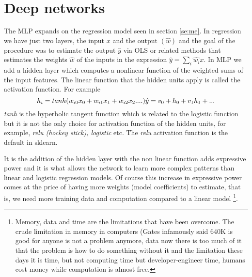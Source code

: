 \documentclass[12pt]{report}
\begin{document}


\section{Deep networks}
\label{se:deep}

The MLP expands on the regression model seen in section \ref{se:me}. In regression we have just two layers, the input $x$ and the output $(\hat{w})$ and the goal of the procedure was to estimate the output $\hat{y}$ via OLS or related methods that estimates the weights $\hat{w}$ of the inputs in the expression $\hat{y} = \sum_i \hat{w_i} x$. In MLP we add a hidden layer which computes a nonlinear function of the weighted sums of the input features. The linear function that the hidden units apply is called the activation function. For example
\begin{equation}
h_i = tanh(w_{i0}x_0 + w_{i1}x_1 + w_{i2}x_2 ....) \\
\hat{y} = v_0 + h_0 + v_1 h_1 + ...
\end{equation}
\textit{tanh} is the hyperbolic tangent function which is related to the logistic function but it is not the only choice for activation function of the hidden units, for example, \textit{relu (hockey stick), logistic} etc. The \textit{relu} activation function is the default in sklearn.

It is the addition of the hidden layer with the non linear function adds expressive power and it is what allows the network to learn more complex patterns than linear and logistic regression models. Of course this increase in expressive power comes at the price of having more weights (model coefficients) to estimate, that is, we need more training data and computation compared to a linear model \footnote{Memory, data and time are the limitations that have been overcome. The crude limitation in memory in computers (Gates infamously said  640K is good for anyone is not a problem anymore, data now there is too much of it that the problem is how to do something without it and the limitation these days it is time, but not computing time but developer-engineer time, humans cost money while computation is almost free.}.
\end{document}
